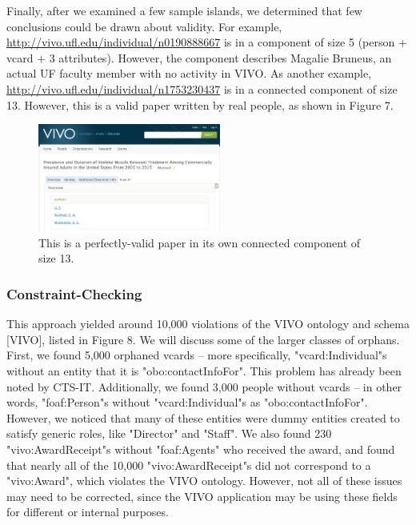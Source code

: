\documentclass[11pt]{article}
\begin{document}
\pagebreak

Finally, after we examined a few sample islands, we determined that few conclusions could be drawn about validity. For example, \url{http://vivo.ufl.edu/individual/n0190888667} is in a component of size 5 (person + vcard + 3 attributes). However, the component describes Magalie Bruneus, an actual UF faculty member with no activity in VIVO. As another example, \url{http://vivo.ufl.edu/individual/n1753230437} is in a connected component of size 13. However, this is a valid paper written by real people, as shown in Figure 7.

\begin{figure}[h!]
\centering
\includegraphics[width=6cm]{valid-paper.png}
\caption{This is a perfectly-valid paper in its own connected component of size 13.}
\label{fig:output}
\end{figure}

\pagebreak
\subsubsection*{Constraint-Checking}
This approach yielded around 10,000 violations of the VIVO ontology and schema [VIVO], listed in Figure 8. We will discuss some of the larger classes of orphans. First, we found 5,000 orphaned vcards -- more specifically, "vcard:Individual"s without an entity that it is "obo:contactInfoFor". This problem has already been noted by CTS-IT. Additionally, we found 3,000 people without vcards -- in other words, "foaf:Person"s without "vcard:Individual"s as "obo:contactInfoFor". However, we noticed that many of these entities were dummy entities created to satisfy generic roles, like "Director" and "Staff". We also found 230 "vivo:AwardReceipt"s without "foaf:Agents" who received the award, and found that nearly all of the 10,000 "vivo:AwardReceipt"s did not correspond to a "vivo:Award", which violates the VIVO ontology. However, not all of these issues may need to be corrected, since the VIVO application may be using these fields for different or internal purposes.
\end{document}
